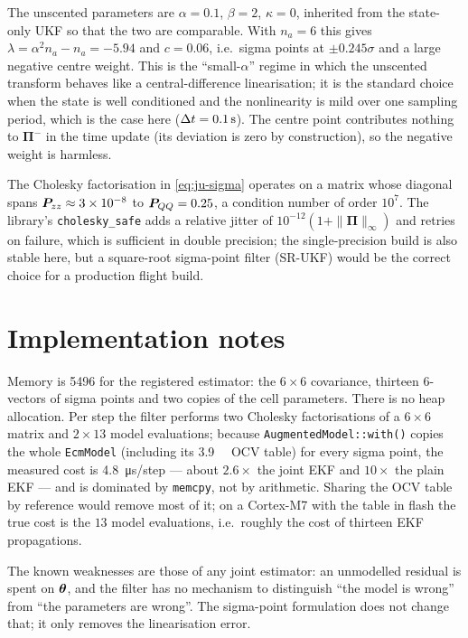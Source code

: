 The unscented parameters are $\alpha=0.1$, $\beta=2$, $\kappa=0$, inherited from the state-only UKF
so that the two are comparable.  With $n_a=6$ this gives $\lambda=\alpha^2 n_a-n_a=-5.94$ and
$c=0.06$, i.e.\ sigma points at $\pm0.245\sigma$ and a large negative centre weight.  This is the
``small-$\alpha$'' regime in which the unscented transform behaves like a central-difference
linearisation; it is the standard choice when the state is well conditioned and the nonlinearity is
mild over one sampling period, which is the case here ($\Delta t=\SI{0.1}{\second}$).  The centre point
contributes nothing to $\bm{\Pi}^-$ in the time update (its deviation is zero by construction), so
the negative weight is harmless.

The Cholesky factorisation in \eqref{eq:ju-sigma} operates on a matrix whose diagonal spans
$\bm{P}_{zz}\approx3\times10^{-8}$ to $\bm{P}_{QQ}=0.25$, a condition number of order $10^{7}$.
The library's \texttt{cholesky\_safe} adds a relative jitter of $10^{-12}(1+\|\bm{\Pi}\|_\infty)$
and retries on failure, which is sufficient in double precision; the single-precision build is also
stable here, but a square-root sigma-point filter (SR-UKF) would be the correct choice for a
production flight build.

\section{Implementation notes}
Memory is \SI{5496}{\byte} for the registered estimator: the $6\times6$ covariance, thirteen
$6$-vectors of sigma points and two copies of the cell parameters.  There is no heap allocation.
Per step the filter performs two Cholesky factorisations of a $6\times6$ matrix and $2\times13$
model evaluations; because \texttt{AugmentedModel::with()} copies the whole \texttt{EcmModel}
(including its \SI{3.9}{\kilo\byte} OCV table) for every sigma point, the measured cost is
\SI{4.8}{\micro\second}/step --- about $2.6\times$ the joint EKF and $10\times$ the plain
EKF --- and is dominated by \texttt{memcpy}, not by arithmetic.  Sharing the OCV table by reference
would remove most of it; on a Cortex-M7 with the table in flash the true cost is the $13$ model
evaluations, i.e.\ roughly the cost of thirteen EKF propagations.

The known weaknesses are those of any joint estimator: an unmodelled residual is spent on
$\bm{\theta}$, and the filter has no mechanism to distinguish ``the model is wrong'' from ``the
parameters are wrong''.  The sigma-point formulation does not change that; it only removes the
linearisation error.

